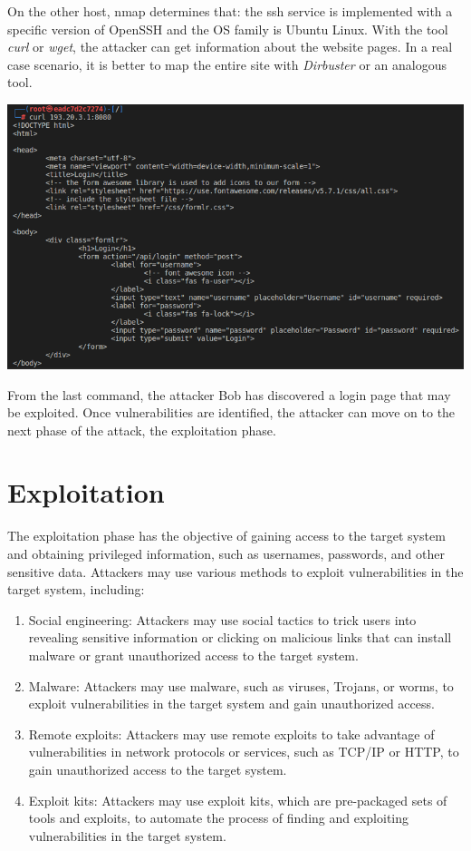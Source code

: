 \documentclass[a4paper, 12pt, oneside]{extbook}
\begin{document}
On the other host, nmap determines that: the ssh service is implemented with a specific version of OpenSSH and the OS family is Ubuntu Linux. 
\newline With the tool \textit{curl} or \textit{wget}, the attacker can get information about the website pages. In a real case scenario, it is better to map the entire site with \textit{Dirbuster} or an analogous tool.
\begin{center}
  \includegraphics[scale=0.66]{../Image/webserver_curl.PNG}
\end{center}
From the last command, the attacker Bob has discovered a login page that may be exploited.
Once vulnerabilities are identified, the attacker can move on to the next phase of the attack, the exploitation phase.

\chapter{Exploitation}
The exploitation phase has the objective of gaining access to the target system and obtaining privileged information, such as usernames, passwords, and other sensitive data. 
Attackers may use various methods to exploit vulnerabilities in the target system, including:
\begin{enumerate}
  \item Social engineering: Attackers may use social tactics to trick users into revealing sensitive information or clicking on malicious links that can install malware or grant unauthorized access to the target system.
  \item Malware: Attackers may use malware, such as viruses, Trojans, or worms, to exploit vulnerabilities in the target system and gain unauthorized access.
  \item Remote exploits: Attackers may use remote exploits to take advantage of vulnerabilities in network protocols or services, such as TCP/IP or HTTP, to gain unauthorized access to the target system.
  \item Exploit kits: Attackers may use exploit kits, which are pre-packaged sets of tools and exploits, to automate the process of finding and exploiting vulnerabilities in the target system.
\end{enumerate}
\end{document}
